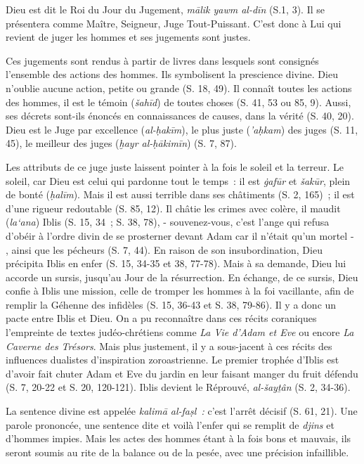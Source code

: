 Dieu est dit le Roi du Jour du Jugement, \emph{mālik yawm al-dīn} (S.1,
3). Il se présentera comme Maître, Seigneur, Juge Tout-Puissant. C'est
donc à Lui qui revient de juger les hommes et ses jugements sont justes.

Ces jugements sont rendus à partir de livres dans lesquels sont
consignés l'ensemble des actions des hommes. Ils symbolisent la
prescience divine. Dieu n'oublie aucune action, petite ou grande (S. 18,
49). Il connaît toutes les actions des hommes, il est le témoin
(\emph{šahīd}) de toutes choses (S. 41, 53 ou 85, 9). Aussi, ses décrets
sont-ils énoncés en connaissances de causes, dans la vérité (S. 40, 20).
Dieu est le Juge par excellence (\emph{al-ḥakīm}), le plus juste
(\emph{'aḥkam}) des juges (S. 11, 45), le meilleur des juges (\emph{ḫayr
al-ḥākimīn}) (S. 7, 87).

Les attributs de ce juge juste laissent pointer à la fois le soleil et
la terreur. Le soleil, car Dieu est celui qui pardonne tout le temps~:
il est \emph{ġafūr} et \emph{šakūr}, plein de bonté (\emph{ḥalīm}). Mais
il est aussi terrible dans ses châtiments (S. 2, 165)~; il est d'une
rigueur redoutable (S. 85, 12). Il châtie les crimes avec colère, il
maudit (\emph{la`ana}) Iblis (S. 15, 34~; S. 38, 78), - souvenez-vous,
c'est l'ange qui refusa d'obéir à l'ordre divin de se prosterner devant
Adam car il n'était qu'un mortel - , ainsi que les pécheurs (S. 7, 44).
En raison de son insubordination, Dieu précipita Iblis en enfer (S. 15,
34-35 et 38, 77-78). Mais à sa demande, Dieu lui accorde un sursis,
jusqu'au Jour de la résurrection. En échange, de ce sursis, Dieu confie
à Iblis une mission, celle de tromper les hommes à la foi vacillante,
afin de remplir la Géhenne des infidèles (S. 15, 36-43 et S. 38, 79-86).
Il y a donc un pacte entre Iblis et Dieu. On a pu reconnaître dans ces
récits coraniques l'empreinte de textes judéo-chrétiens comme \emph{La
Vie d'Adam et Eve} ou encore \emph{La Caverne des Trésors}. Mais plus
justement, il y a sous-jacent à ces récits des influences dualistes
d'inspiration zoroastrienne. Le premier trophée d'Iblis
est d'avoir fait chuter Adam et Eve du jardin en leur faisant manger du
fruit défendu (S. 7, 20-22 et S. 20, 120-121). Iblis devient le
Réprouvé, \emph{al-šayṯân} (S. 2, 34-36).

La sentence divine est appelée \emph{kalimā al-faṣl~:} c'est l'arrêt
décisif (S. 61, 21). Une parole prononcée, une sentence dite et voilà
l'enfer qui se remplit de \emph{djins} et d'hommes impies. Mais les
actes des hommes étant à la fois bons et mauvais, ils seront soumis au
rite de la balance ou de la pesée, avec une précision infaillible.

